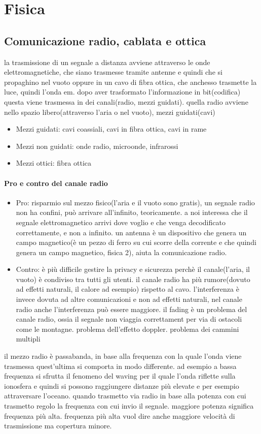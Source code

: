 \section{Fisica}
\subsection{Comunicazione radio, cablata e ottica}
la trasmissione di un segnale a distanza avviene attraverso le onde elettromagnetiche, che siano trasmesse tramite antenne e quindi che si propaghino nel vuoto oppure in un cavo di fibra ottica, che anchesso trasmette la luce, quindi l’onda em.
dopo aver trasformato l'informazione in bit(codifica) questa viene trasmessa in dei canali(radio, mezzi guidati). quella radio avviene nello spazio libero(attraverso l’aria o nel vuoto), mezzi guidati(cavi)
\begin{itemize}
    \item Mezzi guidati: cavi coassiali, cavi in fibra ottica, cavi in rame
    \item Mezzi non guidati: onde radio, microonde, infrarossi
    \item Mezzi ottici: fibra ottica
\end{itemize}
\paragraph{Pro e contro del canale radio}
\begin{itemize}    
    \item Pro: risparmio sul mezzo fisico(l’aria e il vuoto sono gratis), un segnale radio non ha confini, può arrivare all’infinito, teoricamente. a noi interessa che il segnale elettromagnetico arrivi dove voglio e che venga decodificato correttamente, e non a infinito. 
un antenna è un dispositivo che genera un campo magnetico(è un pezzo di ferro su cui scorre della corrente e che quindi genera un campo magnetico, fisica 2), aiuta la comunicazione radio. 
    \item Contro: è più difficile gestire la privacy e sicurezza perchè il canale(l’aria, il vuoto) è condiviso tra tutti gli utenti. il canale radio ha più rumore(dovuto ad effetti naturali, il calore ad esempio) rispetto al cavo. l’interferenza è invece dovuta ad altre comunicazioni e non ad effetti naturali, nel canale radio anche l’interferenza può essere maggiore. il fading è un problema del canale radio, ossia il segnale non viaggia correttament per via di ostacoli come le montagne. problema dell’effetto doppler. problema dei cammini multipli
\end{itemize}
il mezzo radio è passabanda, in base alla frequenza con la quale l'onda viene trasmessa quest'ultima si comporta in modo differente. ad esempio a bassa frequenza si sfrutta il fenomeno del waving per il quale l'onda riflette sulla ionosfera e quindi si possono raggiungere distanze più elevate e per esempio attraversare l'oceano.
quando trasmetto via radio in base alla potenza con cui trasmetto regolo la frequenza con cui invio il segnale. maggiore potenza significa frequenza più alta. frequenza più alta vuol dire anche maggiore velocità di trasmissione ma copertura minore.
